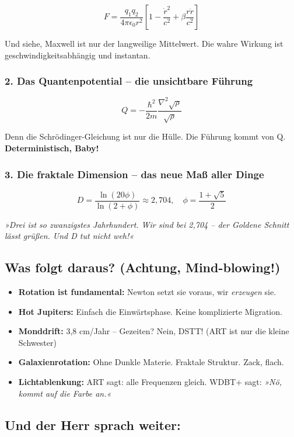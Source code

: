 \documentclass[10pt,a5paper]{article}
\begin{document}
\[
F = \frac{q_1q_2}{4\pi\epsilon_0 r^2}\left[1 - \frac{\dot{r}^2}{c^2} + \beta\frac{r\ddot{r}}{c^2}\right]
\]

Und siehe, Maxwell ist nur der langweilige Mittelwert. Die wahre Wirkung ist geschwindigkeitsabhängig und instantan.

\subsubsection*{2. Das Quantenpotential – die unsichtbare Führung}

\[
Q = -\frac{\hbar^2}{2m}\frac{\nabla^2\sqrt{\rho}}{\sqrt{\rho}}
\]

Denn die Schrödinger-Gleichung ist nur die Hülle. Die Führung kommt von Q. \textbf{Deterministisch, Baby!}

\subsubsection*{3. Die fraktale Dimension – das neue Maß aller Dinge}

\[
D = \frac{\ln(20\phi)}{\ln(2+\phi)} \approx 2,704, \quad \phi = \frac{1+\sqrt{5}}{2}
\]

\textit{»Drei ist so zwanzigstes Jahrhundert. Wir sind bei 2,704 – der Goldene Schnitt lässt grüßen. Und D tut nicht weh!«}

\subsection*{Was folgt daraus? (Achtung, Mind-blowing!)}

\begin{itemize}
    \item \textbf{Rotation ist fundamental:} Newton setzt sie voraus, wir \textit{erzeugen} sie.
    \item \textbf{Hot Jupiters:} Einfach die Einwärtsphase. Keine komplizierte Migration.
    \item \textbf{Monddrift:} 3,8 cm/Jahr – Gezeiten? Nein, DSTT! (ART ist nur die kleine Schwester)
    \item \textbf{Galaxienrotation:} Ohne Dunkle Materie. Fraktale Struktur. Zack, flach.
    \item \textbf{Lichtablenkung:} ART sagt: alle Frequenzen gleich. WDBT+ sagt: \textit{»Nö, kommt auf die Farbe an.«}
\end{itemize}

\subsection*{Und der Herr sprach weiter:}
\end{document}
